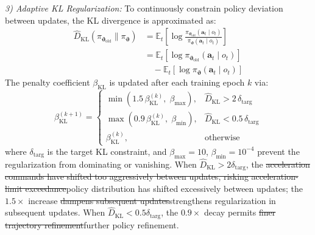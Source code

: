 \documentclass[lettersize,journal]{IEEEtran}
\newcommand{\hladd}[1]{{\color{blue}#1}}
\newcommand{\hldel}[1]{{\color{red}\sout{#1}}}
\begin{document}
\emph{3) Adaptive KL Regularization:} To continuously constrain policy deviation between updates, the KL divergence is approximated as:
\begin{equation}
\label{eq:kl_approx}
\begin{split}
\hat{D}_{\mathrm{KL}}\!\left(\pi_{\boldsymbol{\vartheta}_{\mathrm{old}}} \| \pi_{\boldsymbol{\vartheta}}\right) &= \mathbb{E}_t\!\left[\log\frac{\pi_{\boldsymbol{\vartheta}_{\mathrm{old}}}(\mathbf{a}_t \mid o_t)}{\pi_{\boldsymbol{\vartheta}}(\mathbf{a}_t \mid o_t)}\right] \\
&= \mathbb{E}_t\!\left[\log\pi_{\boldsymbol{\vartheta}_{\mathrm{old}}}(\mathbf{a}_t \mid o_t)\right] \\
&\quad - \mathbb{E}_t\!\left[\log\pi_{\boldsymbol{\vartheta}}(\mathbf{a}_t \mid o_t)\right]
\end{split}
\end{equation}
The penalty coefficient $\beta_{\mathrm{KL}}$ is updated after each training epoch $k$ via:
\begin{equation}
\label{eq:kl_adapt}
\beta_{\mathrm{KL}}^{(k+1)} =
\begin{cases}
\min\!\left(1.5\,\beta_{\mathrm{KL}}^{(k)},\; \beta_{\max}\right), & \hat{D}_{\mathrm{KL}} > 2\,\delta_{\mathrm{targ}} \\[6pt]
\max\!\left(0.9\,\beta_{\mathrm{KL}}^{(k)},\; \beta_{\min}\right), & \hat{D}_{\mathrm{KL}} < 0.5\,\delta_{\mathrm{targ}} \\[6pt]
\beta_{\mathrm{KL}}^{(k)}, & \text{otherwise}
\end{cases}
\end{equation}
where $\delta_{\mathrm{targ}}$ is the target KL constraint, and
$\beta_{\max}=10$, $\beta_{\min}=10^{-4}$ prevent the regularization from
dominating or vanishing. When
$\hat{D}_{\mathrm{KL}}>2\delta_{\mathrm{targ}}$, the
\hldel{acceleration commands have shifted too aggressively between updates,
risking acceleration-limit exceedance}\hladd{policy distribution has shifted
excessively between updates}; the $1.5\times$ increase
\hldel{dampens subsequent updates}\hladd{strengthens regularization in
subsequent updates}. When
$\hat{D}_{\mathrm{KL}}<0.5\delta_{\mathrm{targ}}$, the $0.9\times$ decay
permits \hldel{finer trajectory refinement}\hladd{further policy refinement}.
\end{document}
